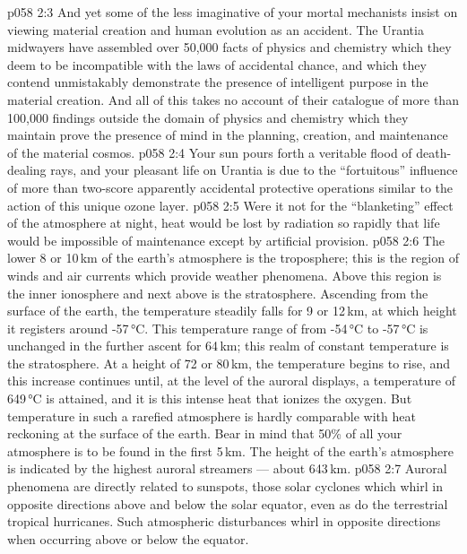 \vs p058 2:3 And yet some of the less imaginative of your mortal mechanists insist on viewing material creation and human evolution as an accident. The Urantia midwayers have assembled over 50,000 facts of physics and chemistry which they deem to be incompatible with the laws of accidental chance, and which they contend unmistakably demonstrate the presence of intelligent purpose in the material creation. And all of this takes no account of their catalogue of more than 100,000 findings outside the domain of physics and chemistry which they maintain prove the presence of mind in the planning, creation, and maintenance of the material cosmos.
\vs p058 2:4 Your sun pours forth a veritable flood of death\hyp{}dealing rays, and your pleasant life on Urantia is due to the “fortuitous” influence of more than two\hyp{}score apparently accidental protective operations similar to the action of this unique ozone layer.
\vs p058 2:5 Were it not for the “blanketing” effect of the atmosphere at night, heat would be lost by radiation so rapidly that life would be impossible of maintenance except by artificial provision.
\vs p058 2:6 \pc The lower 8 or 10\,km of the earth’s atmosphere is the troposphere; this is the region of winds and air currents which provide weather phenomena. Above this region is the inner ionosphere and next above is the stratosphere. Ascending from the surface of the earth, the temperature steadily falls for 9 or 12\,km, at which height it registers around -57\,°C. This temperature range of from -54\,°C to -57\,°C is unchanged in the further ascent for 64\,km; this realm of constant temperature is the stratosphere. At a height of 72 or 80\,km, the temperature begins to rise, and this increase continues until, at the level of the auroral displays, a temperature of 649\,°C is attained, and it is this intense heat that ionizes the oxygen. But temperature in such a rarefied atmosphere is hardly comparable with heat reckoning at the surface of the earth. Bear in mind that 50\% of all your atmosphere is to be found in the first 5\,km. The height of the earth’s atmosphere is indicated by the highest auroral streamers --- about 643\,km.
\vs p058 2:7 Auroral phenomena are directly related to sunspots, those solar cyclones which whirl in opposite directions above and below the solar equator, even as do the terrestrial tropical hurricanes. Such atmospheric disturbances whirl in opposite directions when occurring above or below the equator.
